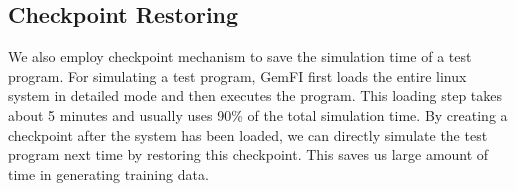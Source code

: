 \subsection{Checkpoint Restoring}
We also employ checkpoint mechanism to save the simulation time of a test program. For simulating a test program, GemFI first loads the entire linux system in detailed mode and then executes the program. This loading step takes about 5 minutes and usually uses 90\% of the total simulation time. By creating a checkpoint after the system has been loaded, we can directly simulate the test program next time by restoring this checkpoint. This saves us large amount of time in generating training data. 



